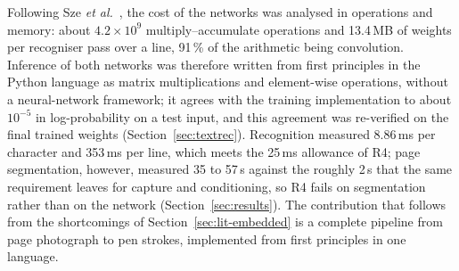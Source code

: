 Following Sze \emph{et al.}~\cite{sze2017}, the cost of the networks was analysed in operations and memory: about $4.2\times10^{9}$ multiply--accumulate operations and 13.4\,MB of weights per recogniser pass over a line, 91\,\% of the arithmetic being convolution.
Inference of both networks was therefore written from first principles in the Python language as matrix multiplications and element-wise operations, without a neural-network framework; it agrees with the training implementation to about $10^{-5}$ in log-probability on a test input, and this agreement was re-verified on the final trained weights (Section~\ref{sec:textrec}).
Recognition measured 8.86\,ms per character and 353\,ms per line, which meets the 25\,ms allowance of R4; page segmentation, however, measured 35 to 57\,s against the roughly 2\,s that the same requirement leaves for capture and conditioning, so R4 fails on segmentation rather than on the network (Section~\ref{sec:results}).
The contribution that follows from the shortcomings of Section~\ref{sec:lit-embedded} is a complete pipeline from page photograph to pen strokes, implemented from first principles in one language.
